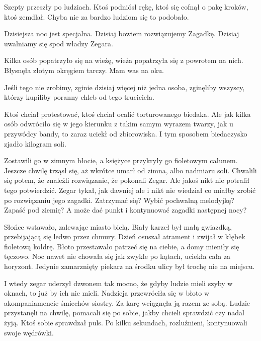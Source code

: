 Szepty przeszły po ludziach.
Ktoś podniósł rękę, ktoś się cofnął o pakę kroków, ktoś zemdlał.
Chyba nie za bardzo ludziom się to podobało.
\begin{dialogue}
	\ds{} Dzisiejsza noc jest specjalna. Dzisiaj bowiem rozwiązujemy Zagadkę. Dzisiaj uwalniamy się spod władzy Zegara.
\end{dialogue}
Kilka osób popatrzyło się na wieżę, wieża popatrzyła się z powrotem na nich. Błysnęła złotym okręgiem tarczy. Mam was na oku.
\begin{dialogue}
	\ds{} Jeśli tego nie zrobimy, zginie dzisiaj więcej niż jedna osoba, zginęliby wszyscy, którzy kupiliby poranny chleb od tego truciciela.
\end{dialogue}
Ktoś chciał protestować, ktoś chciał ocalić torturowanego biedaka.
Ale jak kilka osób odwróciło się w jego kierunku z takim samym wyrazem twarzy, jak u przywódcy bandy, to zaraz uciekł od zbiorowiska.
I tym sposobem biedaczysko zjadło kilogram soli.

Zostawili go w zimnym błocie, a księżyce przykryły go fioletowym całunem.
Jeszcze chwilę trząsł się, aż wkrótce umarł od zimna, albo nadmiaru soli.
Chwalili się potem, że znaleźli rozwiązanie, że pokonali Zegar.
Ale jakoś nikt nie potrafił tego potwierdzić. 
Zegar tykał, jak dawniej ale i nikt nie wiedział co miałby zrobić po rozwiązaniu jego zagadki.
Zatrzymać się? Wybić pochwalną melodyjkę? Zapaść pod ziemię? A może dać punkt i kontynuować zagadki następnej nocy?

Słońce wstawało, zalewając miasto bielą.
Biały karzeł był małą gwiazdką, przebijającą się ledwo przez chmury.
Dzień osuszał atrament i zwijał w kłębek fioletową kołdrę.
Błoto przestawało patrzeć się na ciebie, a domy mieniły się tęczowo.
Noc nawet nie chowała się jak zwykle po kątach, uciekła cała za horyzont.
Jedynie zamarznięty piekarz na środku ulicy był trochę nie na miejscu.

I wtedy zegar uderzył dzwonem tak mocno, że gdyby ludzie mieli szyby w oknach, to już by ich nie mieli.
Nadzieja przewróciła się w błoto w akompaniamencie śmiechów siostry.
Za karę wciągnęła ją razem ze sobą.
Ludzie przystanęli na chwilę, pomacali się po sobie, jakby chcieli sprawdzić czy nadal żyją.
Ktoś sobie sprawdzał puls.
Po kilku sekundach, rozluźnieni, kontynuowali swoje wędrówki.






